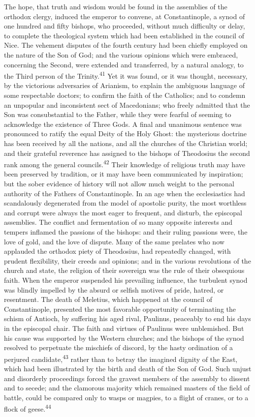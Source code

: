 The hope, that truth and wisdom would be found in the assemblies
of the orthodox clergy, induced the emperor to convene, at
Constantinople, a synod of one hundred and fifty bishops, who
proceeded, without much difficulty or delay, to complete the
theological system which had been established in the council of
Nice. The vehement disputes of the fourth century had been
chiefly employed on the nature of the Son of God; and the various
opinions which were embraced, concerning the Second, were
extended and transferred, by a natural analogy, to the Third
person of the Trinity.\textsuperscript{41} Yet it was found, or it was thought,
necessary, by the victorious adversaries of Arianism, to explain
the ambiguous language of some respectable doctors; to confirm
the faith of the Catholics; and to condemn an unpopular and
inconsistent sect of Macedonians; who freely admitted that the
Son was consubstantial to the Father, while they were fearful of
seeming to acknowledge the existence of Three Gods. A final and
unanimous sentence was pronounced to ratify the equal Deity of
the Holy Ghost: the mysterious doctrine has been received by all
the nations, and all the churches of the Christian world; and
their grateful reverence has assigned to the bishops of
Theodosius the second rank among the general councils.\textsuperscript{42} Their
knowledge of religious truth may have been preserved by
tradition, or it may have been communicated by inspiration; but
the sober evidence of history will not allow much weight to the
personal authority of the Fathers of Constantinople. In an age
when the ecclesiastics had scandalously degenerated from the
model of apostolic purity, the most worthless and corrupt were
always the most eager to frequent, and disturb, the episcopal
assemblies. The conflict and fermentation of so many opposite
interests and tempers inflamed the passions of the bishops: and
their ruling passions were, the love of gold, and the love of
dispute. Many of the same prelates who now applauded the orthodox
piety of Theodosius, had repeatedly changed, with prudent
flexibility, their creeds and opinions; and in the various
revolutions of the church and state, the religion of their
sovereign was the rule of their obsequious faith. When the
emperor suspended his prevailing influence, the turbulent synod
was blindly impelled by the absurd or selfish motives of pride,
hatred, or resentment. The death of Meletius, which happened at
the council of Constantinople, presented the most favorable
opportunity of terminating the schism of Antioch, by suffering
his aged rival, Paulinus, peaceably to end his days in the
episcopal chair. The faith and virtues of Paulinus were
unblemished. But his cause was supported by the Western churches;
and the bishops of the synod resolved to perpetuate the mischiefs
of discord, by the hasty ordination of a perjured candidate,\textsuperscript{43}
rather than to betray the imagined dignity of the East, which had
been illustrated by the birth and death of the Son of God. Such
unjust and disorderly proceedings forced the gravest members of
the assembly to dissent and to secede; and the clamorous majority
which remained masters of the field of battle, could be compared
only to wasps or magpies, to a flight of cranes, or to a flock of
geese.\textsuperscript{44}

